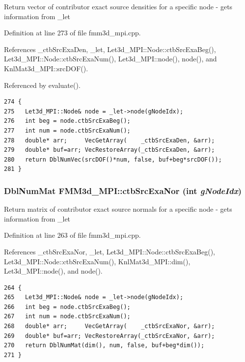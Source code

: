 Return vector of contributor exact source densities for a specific node - gets information from \_\-let 

Definition at line 273 of file fmm3d\_\-mpi.cpp.

References \_\-ctb\-Src\-Exa\-Den, \_\-let, Let3d\_\-MPI::Node::ctb\-Src\-Exa\-Beg(), Let3d\_\-MPI::Node::ctb\-Src\-Exa\-Num(), Let3d\_\-MPI::node(), node(), and Knl\-Mat3d\_\-MPI::src\-DOF().

Referenced by evaluate().

\footnotesize\begin{verbatim}274 {
275   Let3d_MPI::Node& node = _let->node(gNodeIdx);
276   int beg = node.ctbSrcExaBeg();
277   int num = node.ctbSrcExaNum();
278   double* arr;     VecGetArray(    _ctbSrcExaDen, &arr);
279   double* buf=arr; VecRestoreArray(_ctbSrcExaDen, &arr);
280   return DblNumVec(srcDOF()*num, false, buf+beg*srcDOF());
281 }
\end{verbatim}\normalsize 


\subsubsection{\setlength{\rightskip}{0pt plus 5cm}Dbl\-Num\-Mat FMM3d\_\-MPI::ctb\-Src\-Exa\-Nor (int {\em g\-Node\-Idx})\hspace{0.3cm}{\tt  [protected]}}\label{classFMM3d__MPI_3a82dc41a519275dec89995113a38cf3_3a82dc41a519275dec89995113a38cf3}


Return matrix of contributor exact source normals for a specific node - gets information from \_\-let 

Definition at line 263 of file fmm3d\_\-mpi.cpp.

References \_\-ctb\-Src\-Exa\-Nor, \_\-let, Let3d\_\-MPI::Node::ctb\-Src\-Exa\-Beg(), Let3d\_\-MPI::Node::ctb\-Src\-Exa\-Num(), Knl\-Mat3d\_\-MPI::dim(), Let3d\_\-MPI::node(), and node().

\footnotesize\begin{verbatim}264 {
265   Let3d_MPI::Node& node = _let->node(gNodeIdx);
266   int beg = node.ctbSrcExaBeg();
267   int num = node.ctbSrcExaNum();
268   double* arr;     VecGetArray(    _ctbSrcExaNor, &arr);
269   double* buf=arr; VecRestoreArray(_ctbSrcExaNor, &arr);
270   return DblNumMat(dim(), num, false, buf+beg*dim());
271 }
\end{verbatim}\normalsize 


